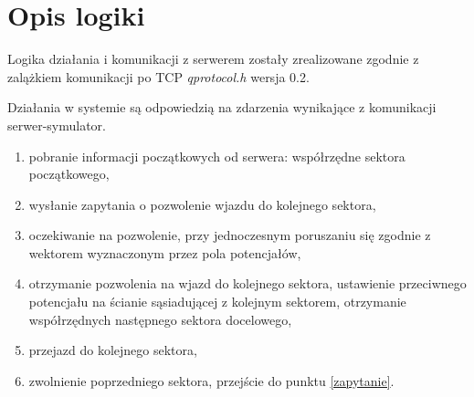 \section{Opis logiki}

Logika działania i komunikacji z serwerem zostały zrealizowane zgodnie z zalążkiem komunikacji po TCP \textit{qprotocol.h} wersja 0.2.

Działania w systemie są odpowiedzią na zdarzenia wynikające z komunikacji serwer-symulator.

\begin{enumerate}
  \item pobranie informacji początkowych od serwera: współrzędne
    sektora początkowego,

  \item wysłanie zapytania o pozwolenie wjazdu do kolejnego
    sektora, \label{zapytanie}

  \item oczekiwanie na pozwolenie, przy jednoczesnym poruszaniu się
    zgodnie z wektorem wyznaczonym przez pola potencjałów,
    
  \item otrzymanie pozwolenia na wjazd do kolejnego sektora,
    ustawienie przeciwnego potencjału na ścianie sąsiadującej z
    kolejnym sektorem, otrzymanie współrzędnych następnego sektora
    docelowego,

  \item przejazd do kolejnego sektora,

  \item zwolnienie poprzedniego sektora, przejście do punktu \ref{zapytanie}.

\end{enumerate}




